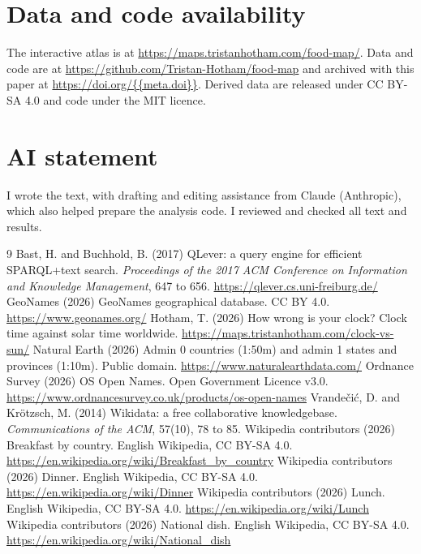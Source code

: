 \documentclass[11pt,a4paper]{article}
\begin{document}
\section*{Data and code availability}
The interactive atlas is at \url{https://maps.tristanhotham.com/food-map/}. Data and code are at \url{https://github.com/Tristan-Hotham/food-map} and archived with this paper at \url{https://doi.org/{{meta.doi}}}. Derived data are released under CC BY-SA 4.0 and code under the MIT licence.

\section*{AI statement}
I wrote the text, with drafting and editing assistance from Claude (Anthropic), which also helped prepare the analysis code. I reviewed and checked all text and results.

\begin{thebibliography}{9}
 Bast, H. and Buchhold, B. (2017) QLever: a query engine for efficient SPARQL+text search. \emph{Proceedings of the 2017 ACM Conference on Information and Knowledge Management}, 647 to 656. \url{https://qlever.cs.uni-freiburg.de/}
 GeoNames (2026) GeoNames geographical database. CC BY 4.0. \url{https://www.geonames.org/}
 Hotham, T. (2026) How wrong is your clock? Clock time against solar time worldwide. \url{https://maps.tristanhotham.com/clock-vs-sun/}
 Natural Earth (2026) Admin 0 countries (1:50m) and admin 1 states and provinces (1:10m). Public domain. \url{https://www.naturalearthdata.com/}
 Ordnance Survey (2026) OS Open Names. Open Government Licence v3.0. \url{https://www.ordnancesurvey.co.uk/products/os-open-names}
 Vrandečić, D. and Krötzsch, M. (2014) Wikidata: a free collaborative knowledgebase. \emph{Communications of the ACM}, 57(10), 78 to 85.
 Wikipedia contributors (2026) Breakfast by country. English Wikipedia, CC BY-SA 4.0. \url{https://en.wikipedia.org/wiki/Breakfast_by_country}
 Wikipedia contributors (2026) Dinner. English Wikipedia, CC BY-SA 4.0. \url{https://en.wikipedia.org/wiki/Dinner}
 Wikipedia contributors (2026) Lunch. English Wikipedia, CC BY-SA 4.0. \url{https://en.wikipedia.org/wiki/Lunch}
 Wikipedia contributors (2026) National dish. English Wikipedia, CC BY-SA 4.0. \url{https://en.wikipedia.org/wiki/National_dish}
\end{thebibliography}
\end{document}
